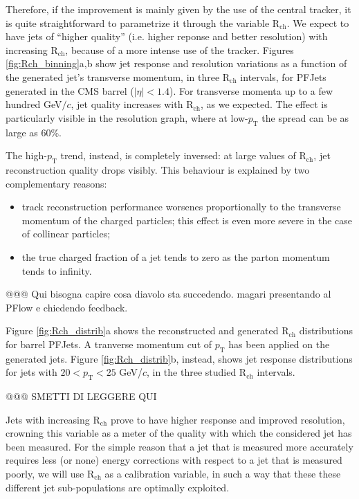 \documentclass{cmspaper}
\begin{document}
Therefore, if the improvement is mainly given by the use of the central tracker, it is quite straightforward to parametrize it through the variable R$_{\mathrm{ch}}$. We expect to have jets of ``higher quality'' (i.e. higher reponse and better resolution) with increasing R$_{\mathrm{ch}}$, because of a more intense use of the tracker. Figures \ref{fig:Rch_binning}a,b show jet response and resolution variations as a function of the generated jet's transverse momentum, in three R$_{\mathrm{ch}}$ intervals, for PFJets generated in the CMS barrel ($|\eta|<1.4$). For transverse momenta up to a few hundred GeV$/c$, jet quality increases with R$_{\mathrm{ch}}$, as we expected. The effect is particularly visible in the resolution graph, where at low-$p_{\mathrm{T}}$ the spread can be as large as 60\%. 

The high-$p_{\mathrm{T}}$ trend, instead, is completely inversed: at large values of R$_{\mathrm{ch}}$, jet reconstruction quality drops visibly. This behaviour is explained by two complementary reasons:
\begin{itemize}
\item track reconstruction performance worsenes proportionally to the transverse momentum of the charged particles; this effect is even more severe in the case of collinear particles;
\item the true charged fraction of a jet tends to zero as the parton momentum tends to infinity.
\end{itemize}
@@@ Qui bisogna capire cosa diavolo sta succedendo. magari presentando al PFlow e chiedendo feedback. 


Figure \ref{fig:Rch_distrib}a shows the reconstructed and generated R$_{\mathrm{ch}}$ distributions for barrel PFJets. A tranverse momentum cut of $p_{\mathrm{T}}$ has been applied on the generated jets. Figure \ref{fig:Rch_distrib}b, instead, shows jet response distributions for jets with $20<p_{\mathrm{T}}<25$ GeV/$c$, in the three studied R$_{\mathrm{ch}}$ intervals.

@@@ SMETTI DI LEGGERE QUI

Jets with increasing R$_{\mathrm{ch}}$ prove to have higher response and improved resolution, crowning this variable as a meter of the quality with which the considered jet has been measured. For the simple reason that a jet that is measured more accurately requires less (or none) energy corrections with respect to a jet that is measured poorly, we will use R$_{\mathrm{ch}}$ as a calibration variable, in such a way that these these different jet sub-populations are optimally exploited.
\end{document}
